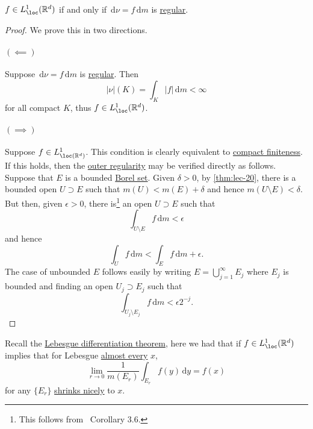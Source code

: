 \begin{lemma}
	\(f \in L^1_{\loc}(\mathbb{R}^d)\) if and only if \(\,\mathrm{d}\nu = f \,\mathrm{d}m\) is \hyperref[def:regular]{regular}.
\end{lemma}
\begin{proof}
	We prove this in two directions.
	\paragraph{\((\impliedby)\)}
	Suppose \(\,\mathrm{d} \nu = f \,\mathrm{d} m\) is \hyperref[def:regular]{regular}. Then
	\[
		\left\vert \nu \right\vert(K) = \int_K \left\vert f \right\vert \,\mathrm{d}m < \infty
	\]
	for all compact \(K\), thus \(f \in L^1_{\loc}(\mathbb{R}^d)\).

	\paragraph{\((\implies)\)}
	Suppose \(f\in L^1_{\loc(\mathbb{R} ^d) }\). This condition is clearly equivalent to
	\hyperref[def:regular-compact-finite]{compact finiteness}. If this holds, then the \hyperref[def:regular-outer-regularity]{outer regularity}
	may be verified directly as follows. Suppose that \(E\) is a bounded \hyperref[def:Borel-set]{Borel set}. Given \(\delta > 0\), by \autoref{thm:lec-20},
	there is a bounded open \(U \supset E\) such that \(m(U) < m(E)+ \delta \) and hence \(m(U\setminus E)< \delta \). But then, given \(\epsilon >0\), there
	is\footnote{This follows from~\cite{folland1999real} Corollary 3.6.} an open \(U \supset E\) such that
	\[
		\int _{U\setminus E}f\,\mathrm{d} m < \epsilon
	\]
	and hence
	\[
		\int _U f\,\mathrm{d} m < \int _E f\,\mathrm{d} m + \epsilon.
	\]
	The case of unbounded \(E\) follows easily by writing \(E = \bigcup_{j=1}^{\infty} E_{j}\)
	where \(E_{j} \) is bounded and finding an open \(U_{j} \supset E_{j} \) such that
	\[
		\int _{U_{j} \setminus E_{j} }f \,\mathrm{d} m < \epsilon 2^{-j}.
	\]
\end{proof}

\begin{prev}
	Recall the \hyperref[thm:Lebesgue-differentiation]{Lebesgue differentiation theorem}, here we had that if \(f \in L^1_{\loc}(\mathbb{R}^d)\)
	implies that for Lebesgue \hyperref[def:mu-almost-everywhere]{almost every} \(x\),
	\[
		\lim_{r \to 0} \frac{1}{m(E_r)} \int_{E_r} f(y) \,\mathrm{d}y = f(x)
	\]
	for any \(\{E_r\}\) \hyperref[def:shrink-nicely]{shrinks nicely} to \(x\).
\end{prev}

